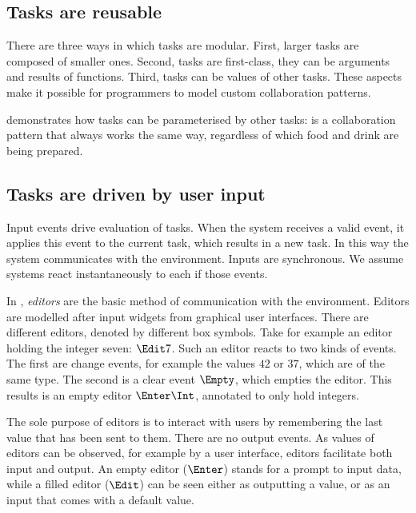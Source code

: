 \subsection{Tasks are reusable}

There are three ways in which tasks are modular.
First, larger tasks are composed of smaller ones.
Second, tasks are first-class, they can be arguments and results of functions.
Third, tasks can be values of other tasks.
These aspects make it possible for programmers to model custom collaboration patterns.

 demonstrates how tasks can be parameterised by other tasks:  is a collaboration pattern that always works the same way, regardless of which food and drink are being prepared.



\subsection{Tasks are driven by user input}

Input events drive evaluation of tasks.
When the system receives a valid event, it applies this event to the current task, which results in a new task.
In this way the system communicates with the environment.
Inputs are synchronous.
We assume systems react instantaneously to each if those events.

In \TOPHAT, \emph{editors} are the basic method of communication with the environment.
Editors are modelled after input widgets from graphical user interfaces.
There are different editors, denoted by different box symbols.
Take for example an editor holding the integer seven: $\Edit 7$.
Such an editor reacts to two kinds of events.
The first are change events, for example the values $42$ or $37$, which are of the same type.
The second is a clear event $\Empty$, which empties the editor.
This results is an empty editor $\Enter \Int$, annotated to only hold integers.


The sole purpose of editors is to interact with users by remembering the last value that has been sent to them.
There are no output events.
As values of editors can be observed, for example by a user interface, editors facilitate both input and output.
An empty editor ($\Enter$) stands for a prompt to input data,
while a filled editor ($\Edit$) can be seen either as outputting a value, or as an input that comes with a default value.



